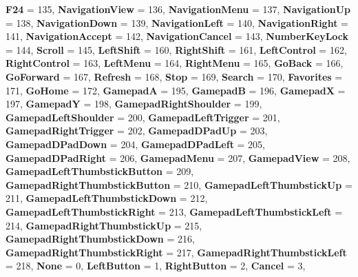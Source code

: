 \begin{DoxyCompactItemize}
\newline
{\bfseries F24} = 135, 
{\bfseries Navigation\+View} = 136, 
{\bfseries Navigation\+Menu} = 137, 
{\bfseries Navigation\+Up} = 138, 
\newline
{\bfseries Navigation\+Down} = 139, 
{\bfseries Navigation\+Left} = 140, 
{\bfseries Navigation\+Right} = 141, 
{\bfseries Navigation\+Accept} = 142, 
\newline
{\bfseries Navigation\+Cancel} = 143, 
{\bfseries Number\+Key\+Lock} = 144, 
{\bfseries Scroll} = 145, 
{\bfseries Left\+Shift} = 160, 
\newline
{\bfseries Right\+Shift} = 161, 
{\bfseries Left\+Control} = 162, 
{\bfseries Right\+Control} = 163, 
{\bfseries Left\+Menu} = 164, 
\newline
{\bfseries Right\+Menu} = 165, 
{\bfseries Go\+Back} = 166, 
{\bfseries Go\+Forward} = 167, 
{\bfseries Refresh} = 168, 
\newline
{\bfseries Stop} = 169, 
{\bfseries Search} = 170, 
{\bfseries Favorites} = 171, 
{\bfseries Go\+Home} = 172, 
\newline
{\bfseries GamepadA} = 195, 
{\bfseries GamepadB} = 196, 
{\bfseries GamepadX} = 197, 
{\bfseries GamepadY} = 198, 
\newline
{\bfseries Gamepad\+Right\+Shoulder} = 199, 
{\bfseries Gamepad\+Left\+Shoulder} = 200, 
{\bfseries Gamepad\+Left\+Trigger} = 201, 
{\bfseries Gamepad\+Right\+Trigger} = 202, 
\newline
{\bfseries Gamepad\+D\+Pad\+Up} = 203, 
{\bfseries Gamepad\+D\+Pad\+Down} = 204, 
{\bfseries Gamepad\+D\+Pad\+Left} = 205, 
{\bfseries Gamepad\+D\+Pad\+Right} = 206, 
\newline
{\bfseries Gamepad\+Menu} = 207, 
{\bfseries Gamepad\+View} = 208, 
{\bfseries Gamepad\+Left\+Thumbstick\+Button} = 209, 
{\bfseries Gamepad\+Right\+Thumbstick\+Button} = 210, 
\newline
{\bfseries Gamepad\+Left\+Thumbstick\+Up} = 211, 
{\bfseries Gamepad\+Left\+Thumbstick\+Down} = 212, 
{\bfseries Gamepad\+Left\+Thumbstick\+Right} = 213, 
{\bfseries Gamepad\+Left\+Thumbstick\+Left} = 214, 
\newline
{\bfseries Gamepad\+Right\+Thumbstick\+Up} = 215, 
{\bfseries Gamepad\+Right\+Thumbstick\+Down} = 216, 
{\bfseries Gamepad\+Right\+Thumbstick\+Right} = 217, 
{\bfseries Gamepad\+Right\+Thumbstick\+Left} = 218, 
\newline
{\bfseries None} = 0, 
{\bfseries Left\+Button} = 1, 
{\bfseries Right\+Button} = 2, 
{\bfseries Cancel} = 3, 
\newline

\end{DoxyCompactItemize}
